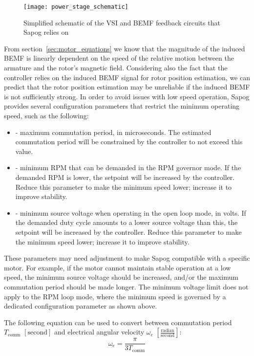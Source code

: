 \documentclass{zubaxdoc}
\begin{document}
\begin{figure}[hbt]
    \centering
    \texttt{[image: power\_stage\_schematic]}
    \caption{Simplified schematic of the VSI and BEMF feedback circuits that Sapog relies on
    \label{power_stage_schematic}}
\end{figure}

From section~\ref{sec:motor_equations} we know that the magnitude of the induced BEMF is linearly
dependent on the speed of the relative motion between the armature and the rotor's magnetic field.
Considering also the fact that the controller relies on the induced BEMF signal for rotor position estimation,
we can predict that the rotor position estimation may be unreliable if the induced BEMF is not sufficiently
strong.
In order to avoid issues with low speed operation, Sapog provides several configuration parameters that
restrict the minimum operating speed, such as the following:

\begin{itemize}
\item {} - maximum commutation period, in microseconds.
The estimated commutation period will be constrained by the controller to not exceed this value.
\item {} - minimum RPM that can be demanded in the RPM governor mode.
If the demanded RPM is lower, the setpoint will be increased by the controller.
Reduce this parameter to make the minimum speed lower; increase it to improve stability.
\item {} - minimum source voltage when operating in the open loop mode, in volts.
If the demanded duty cycle amounts to a lower source voltage than this, the setpoint will be
increased by the controller.
Reduce this parameter to make the minimum speed lower; increase it to improve stability.
\end{itemize}

These parameters may need adjustment to make Sapog compatible with a specific motor.
For example, if the motor cannot maintain stable operation at a low speed,
the minimum source voltage should be increased,
and/or the maximum commutation period should be made longer.
The minimum voltage limit does not apply to the RPM loop mode,
where the minimum speed is governed by a dedicated configuration parameter as shown above.

The following equation can be used to convert between commutation period $T_\text{comm}$
$\left[\text{second}\right]$
and electrical angular velocity $\omega_e$ $\left[\frac{\text{radian}}{\text{second}}\right]$:
\begin{equation}
\omega_e = \frac{\pi}{3 T_\text{comm}}
\end{equation}
\end{document}
